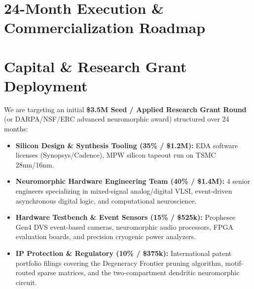 \documentclass[11pt,letterpaper]{article}
\begin{document}
\newpage

\section{24-Month Execution \& Commercialization Roadmap}

\begin{center}
\end{center}

\vspace{10pt}

\section{Capital \& Research Grant Deployment}

We are targeting an initial \textbf{\$3.5M Seed / Applied Research Grant Round} (or DARPA/NSF/ERC advanced neuromorphic award) structured over 24 months:
\begin{itemize}[leftmargin=*]
    \item \textbf{Silicon Design \& Synthesis Tooling (35\% / \$1.2M):} EDA software licenses (Synopsys/Cadence), MPW silicon tapeout run on TSMC 28nm/16nm.
    \item \textbf{Neuromorphic Hardware Engineering Team (40\% / \$1.4M):} 4 senior engineers specializing in mixed-signal analog/digital VLSI, event-driven asynchronous digital logic, and computational neuroscience.
    \item \textbf{Hardware Testbench \& Event Sensors (15\% / \$525k):} Prophesee Gen4 DVS event-based cameras, neuromorphic audio processors, FPGA evaluation boards, and precision cryogenic power analyzers.
    \item \textbf{IP Protection \& Regulatory (10\% / \$375k):} International patent portfolio filings covering the Degeneracy Frontier pruning algorithm, motif-routed sparse matrices, and the two-compartment dendritic neuromorphic circuit.
\end{itemize}
\end{document}
